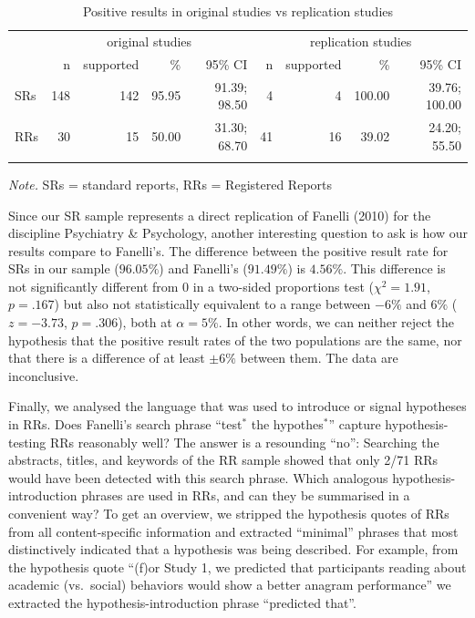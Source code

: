 \documentclass[british,,man,floatsintext]{apa6}
\begin{document}
\begin{table}[tbp]
\begin{center}
\begin{threeparttable}
\caption{\label{tab:unnamed-chunk-5}Positive results in original studies vs replication studies}
\begin{tabular}{lrrrrrrrr}
\toprule
 & \multicolumn{4}{c}{original studies} & \multicolumn{4}{c}{replication studies} \\
\cmidrule(r){2-5} \cmidrule(r){6-9}
 & n & supported & \% & 95\% CI & n & supported & \% & 95\% CI\\
\midrule
SRs & 148 & 142 & 95.95 & 91.39; 98.50 & 4 & 4 & 100.00 & 39.76; 100.00\\
RRs & 30 & 15 & 50.00 & 31.30; 68.70 & 41 & 16 & 39.02 & 24.20; 55.50\\
\bottomrule
\addlinespace
\end{tabular}
\begin{tablenotes}[para]
\normalsize{\textit{Note.} SRs = standard reports, RRs = Registered Reports}
\end{tablenotes}
\end{threeparttable}
\end{center}
\end{table}

Since our SR sample represents a direct replication of Fanelli (2010) for the discipline Psychiatry \& Psychology, another interesting question to ask is how our results compare to Fanelli's.
The difference between the positive result rate for SRs in our sample (\(96.05\%\)) and Fanelli's (\(91.49\%\)) is \(4.56\%\). This difference is not significantly different from 0 in a two-sided proportions test (\(\chi^2 = 1.91\), \(p= .167\)) but also not statistically equivalent to a range between \(-6\%\) and \(6\%\) (\(z = -3.73\), \(p= .306\)), both at \(\alpha = 5\%\).
In other words, we can neither reject the hypothesis that the positive result rates of the two populations are the same, nor that there is a difference of at least \(\pm 6\%\) between them.
The data are inconclusive.

Finally, we analysed the language that was used to introduce or signal hypotheses in RRs.
Does Fanelli's search phrase \enquote{test\(^\ast\) the hypothes\(^\ast\)} capture hypothesis-testing RRs reasonably well?
The answer is a resounding \enquote{no}:
Searching the abstracts, titles, and keywords of the RR sample showed that only 2/71 RRs would have been detected with this search phrase.
Which analogous hypothesis-introduction phrases are used in RRs, and can they be summarised in a convenient way?
To get an overview, we stripped the hypothesis quotes of RRs from all content-specific information and extracted \enquote{minimal} phrases that most distinctively indicated that a hypothesis was being described.
For example, from the hypothesis quote \enquote{(f)or Study 1, we predicted that participants reading about academic (vs.~social) behaviors would show a better anagram performance} we extracted the hypothesis-introduction phrase \enquote{predicted that}.
\end{document}
